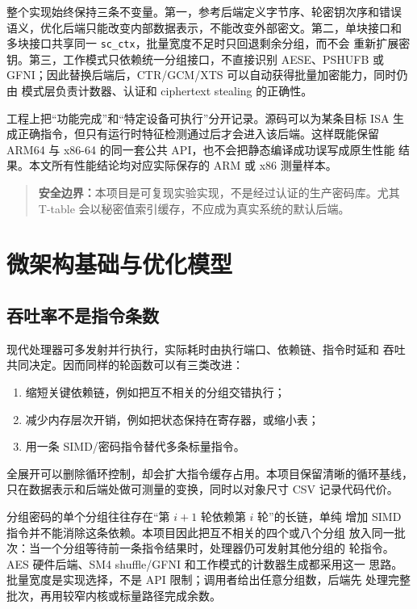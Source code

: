 \documentclass[11pt,a4paper,UTF8,fontset=none]{ctexart}
\begin{document}
整个实现始终保持三条不变量。第一，参考后端定义字节序、轮密钥次序和错误
语义，优化后端只能改变内部数据表示，不能改变外部密文。第二，单块接口和
多块接口共享同一 \texttt{sc\_ctx}，批量宽度不足时只回退剩余分组，而不会
重新扩展密钥。第三，工作模式只依赖统一分组接口，不直接识别 AESE、PSHUFB
或 GFNI；因此替换后端后，CTR/GCM/XTS 可以自动获得批量加密能力，同时仍由
模式层负责计数器、认证和 ciphertext stealing 的正确性。

工程上把“功能完成”和“特定设备可执行”分开记录。源码可以为某条目标 ISA
生成正确指令，但只有运行时特征检测通过后才会进入该后端。这样既能保留
ARM64 与 x86-64 的同一套公共 API，也不会把静态编译成功误写成原生性能
结果。本文所有性能结论均对应实际保存的 ARM 或 x86 测量样本。

\begin{quote}\color{warning}
\textbf{安全边界：}本项目是可复现实验实现，不是经过认证的生产密码库。尤其
T-table 会以秘密值索引缓存，不应成为真实系统的默认后端。
\end{quote}

\section{微架构基础与优化模型}

\subsection{吞吐率不是指令条数}

现代处理器可多发射并行执行，实际耗时由执行端口、依赖链、指令时延和
吞吐共同决定。因而同样的轮函数可以有三类改进：
\begin{enumerate}
  \item 缩短关键依赖链，例如把互不相关的分组交错执行；
  \item 减少内存层次开销，例如把状态保持在寄存器，或缩小表；
  \item 用一条 SIMD/密码指令替代多条标量指令。
\end{enumerate}
全展开可以删除循环控制，却会扩大指令缓存占用。本项目保留清晰的循环基线，
只在数据表示和后端处做可测量的变换，同时以对象尺寸 CSV 记录代码代价。

分组密码的单个分组往往存在“第 \(i+1\) 轮依赖第 \(i\) 轮”的长链，单纯
增加 SIMD 指令并不能消除这条依赖。本项目因此把互不相关的四个或八个分组
放入同一批次：当一个分组等待前一条指令结果时，处理器仍可发射其他分组的
轮指令。AES 硬件后端、SM4 shuffle/GFNI 和工作模式的计数器生成都采用这一
思路。批量宽度是实现选择，不是 API 限制；调用者给出任意分组数，后端先
处理完整批次，再用较窄内核或标量路径完成余数。
\end{document}

